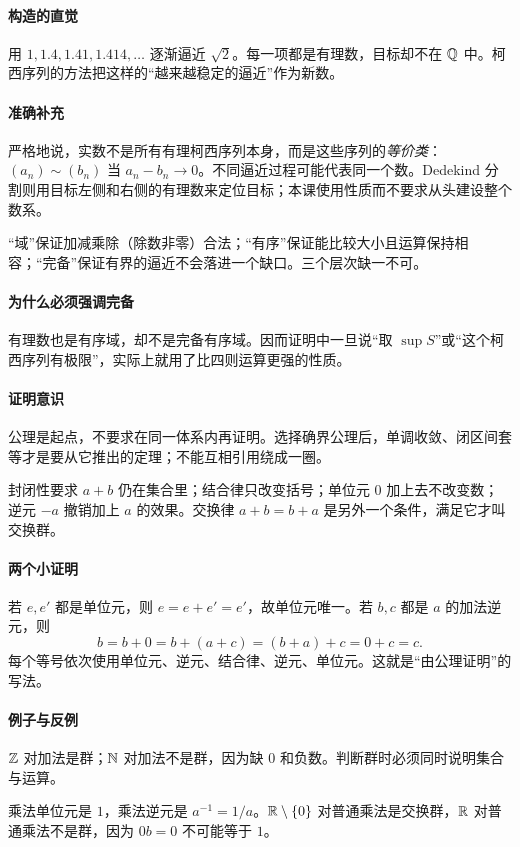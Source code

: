 \paragraph{构造的直觉}用 $1,1.4,1.41,1.414,\ldots$ 逐渐逼近 $\sqrt2$。每一项都是有理数，目标却不在 $\mathbb{Q}$ 中。柯西序列的方法把这样的“越来越稳定的逼近”作为新数。
\paragraph{准确补充}严格地说，实数不是所有有理柯西序列本身，而是这些序列的\emph{等价类}：$(a_n)\sim(b_n)$ 当 $a_n-b_n\to0$。不同逼近过程可能代表同一个数。Dedekind 分割则用目标左侧和右侧的有理数来定位目标；本课使用性质而不要求从头建设整个数系。

“域”保证加减乘除（除数非零）合法；“有序”保证能比较大小且运算保持相容；“完备”保证有界的逼近不会落进一个缺口。三个层次缺一不可。
\paragraph{为什么必须强调完备}有理数也是有序域，却不是完备有序域。因而证明中一旦说“取 $\sup S$”或“这个柯西序列有极限”，实际上就用了比四则运算更强的性质。
\paragraph{证明意识}公理是起点，不要求在同一体系内再证明。选择确界公理后，单调收敛、闭区间套等才是要从它推出的定理；不能互相引用绕成一圈。

封闭性要求 $a+b$ 仍在集合里；结合律只改变括号；单位元 $0$ 加上去不改变数；逆元 $-a$ 撤销加上 $a$ 的效果。交换律 $a+b=b+a$ 是另外一个条件，满足它才叫交换群。
\paragraph{两个小证明}若 $e,e'$ 都是单位元，则 $e=e+e'=e'$，故单位元唯一。若 $b,c$ 都是 $a$ 的加法逆元，则
\[b=b+0=b+(a+c)=(b+a)+c=0+c=c.\]
每个等号依次使用单位元、逆元、结合律、逆元、单位元。这就是“由公理证明”的写法。
\paragraph{例子与反例}$\mathbb{Z}$ 对加法是群；$\mathbb{N}$ 对加法不是群，因为缺 $0$ 和负数。判断群时必须同时说明集合与运算。

乘法单位元是 $1$，乘法逆元是 $a^{-1}=1/a$。$\mathbb{R}\setminus\{0\}$ 对普通乘法是交换群，$\mathbb{R}$ 对普通乘法不是群，因为 $0b=0$ 不可能等于 $1$。

